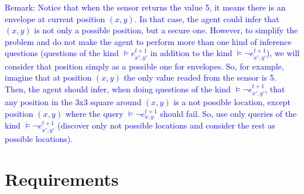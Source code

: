 \documentclass{tufte-handout}
\begin{document}
\begin{fullwidth}
\textcolor{blue}{Remark: Notice that when the sensor returns the value 5, it means there is
an envelope at current position $(x,y)$.
In that case, the agent could infer that $(x,y)$ is not only a possible position, but a secure
one. However, to simplify the problem and do not make the agent to perform more than one kind of inference questions (questions of the kind $\models e_{x',y'}^{t+1}$ in addition to the kind $\models \neg e_{x',y'}^{t+1}$), we will consider that position simply as a  possible one for envelopes. So, for example, imagine that at position $(x,y)$ the only value readed from the sensor is 5. Then, the agent should infer, when doing questions of the kind $\models \neg e_{x',y'}^{t+1}$, that any position in the 3x3 square around $(x,y)$ is a not possible location, except position $(x,y)$ where the query $\models \neg e_{x,y}^{t+1}$ should fail. So, use only queries of the kind $  \models \neg e_{x',y'}^{t+1}$ (discover only not possible locations and consider the rest as possible locations).  }
\end{fullwidth}


\section{Requirements}
\end{document}
